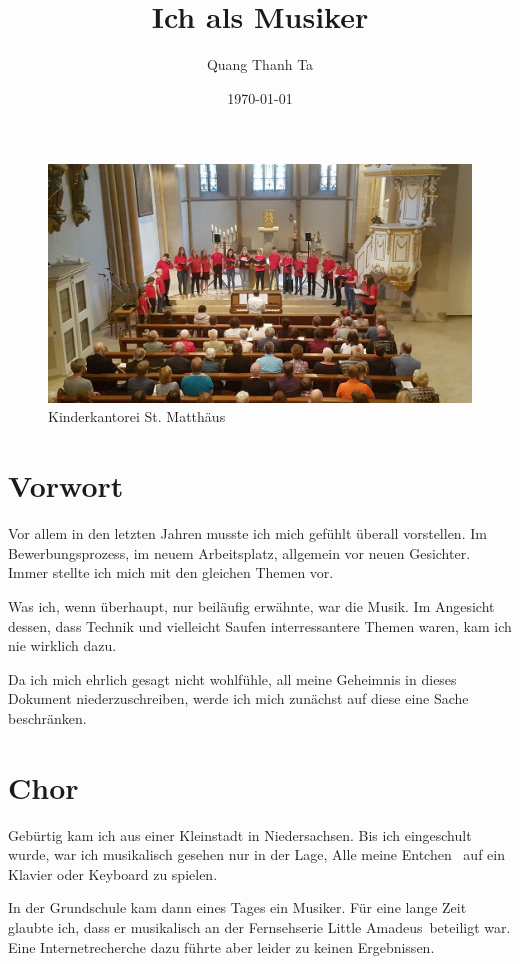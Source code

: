 \documentclass{scrartcl}
\title{ Ich als Musiker }
\author{ Quang Thanh Ta }
\date{\today}
\begin{document}
\maketitle

\begin{figure}[h]
\includegraphics[width=\textwidth]{images/chor.jpg}
\caption{Kinderkantorei St. Matthäus}
\end{figure}

\section{Vorwort}
Vor allem in den letzten Jahren musste ich mich gefühlt überall vorstellen. Im
Bewerbungsprozess, im neuem Arbeitsplatz, allgemein vor neuen Gesichter. Immer
stellte ich mich mit den gleichen Themen vor.

Was ich, wenn überhaupt, nur beiläufig erwähnte, war die Musik. Im Angesicht
dessen, dass Technik und vielleicht Saufen interressantere Themen waren, kam ich
nie wirklich dazu.

Da ich mich ehrlich gesagt nicht wohlfühle, all meine Geheimnis in dieses
Dokument niederzuschreiben, werde ich mich zunächst auf diese eine Sache
beschränken.

\section{Chor}
Gebürtig kam ich aus einer Kleinstadt in Niedersachsen. Bis ich eingeschult 
wurde, war ich musikalisch gesehen nur in der Lage, \glqq Alle meine Entchen
\grqq\ auf ein Klavier oder Keyboard zu spielen.

In der Grundschule kam dann eines Tages ein Musiker. Für eine lange Zeit
glaubte ich, dass er musikalisch an der Fernsehserie \glqq Little Amadeus\grqq\
beteiligt war. Eine Internetrecherche dazu führte aber leider zu keinen
Ergebnissen.
\end{document}
